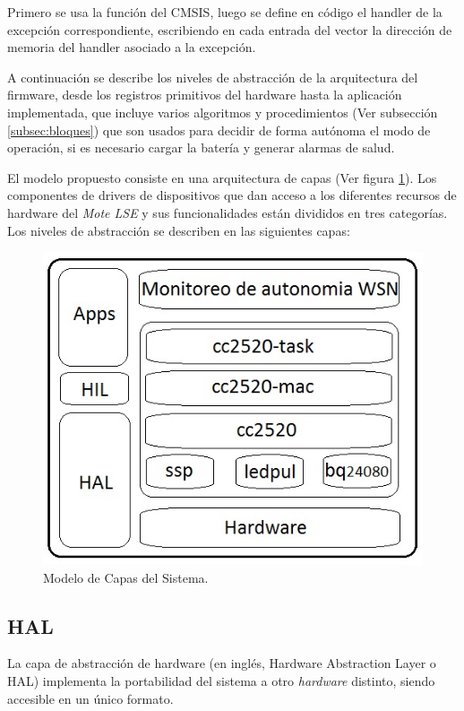 {Primero se usa la función del CMSIS, luego se define en código el handler de la excepción correspondiente, escribiendo en cada entrada del vector la dirección de memoria del handler asociado a la excepción.

A continuación se describe los niveles de abstracción de la arquitectura del firmware, desde los registros primitivos del hardware hasta la aplicación implementada, que incluye varios algoritmos y procedimientos (Ver subsección \ref{subsec:bloques}) que son usados para decidir de forma autónoma el modo de operación, si es necesario cargar la batería y generar alarmas de salud.

El modelo propuesto consiste en una arquitectura de capas (Ver figura \ref{fig:capas}). Los componentes de drivers de dispositivos que dan acceso a los diferentes recursos de hardware del \textit{Mote LSE} y sus funcionalidades están divididos en tres categorías. Los niveles de abstracción se describen en las siguientes capas:

\begin{figure}[h!]
	\centering
    \includegraphics[width=.5\textwidth]{./Figures/arq.png}
    	\caption{Modelo de Capas del Sistema.}
	\label{fig:capas}
\end{figure}


\subsection{HAL}
\label{subsec:hal} 

La capa de abstracción de hardware (en inglés, Hardware Abstraction Layer o HAL) implementa la portabilidad del sistema a otro \textit{hardware} distinto, siendo accesible en un único formato.

}
